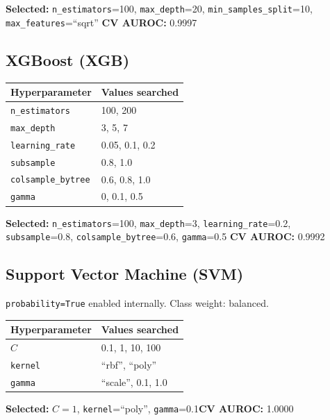 \documentclass[11pt]{article}
\begin{document}
\noindent\textbf{Selected:} \texttt{n\_estimators}=100, \texttt{max\_depth}=20,
\texttt{min\_samples\_split}=10, \texttt{max\_features}=``sqrt''\quad
\textbf{CV AUROC:} 0.9997

\subsection*{XGBoost (XGB)}

\begin{center}
\begin{tabular}{ll}
\toprule
Hyperparameter & Values searched \\
\midrule
\texttt{n\_estimators}      & 100, 200 \\
\texttt{max\_depth}         & 3, 5, 7 \\
\texttt{learning\_rate}     & 0.05, 0.1, 0.2 \\
\texttt{subsample}          & 0.8, 1.0 \\
\texttt{colsample\_bytree}  & 0.6, 0.8, 1.0 \\
\texttt{gamma}              & 0, 0.1, 0.5 \\
\bottomrule
\end{tabular}
\end{center}

\noindent\textbf{Selected:} \texttt{n\_estimators}=100, \texttt{max\_depth}=3,
\texttt{learning\_rate}=0.2, \texttt{subsample}=0.8,
\texttt{colsample\_bytree}=0.6, \texttt{gamma}=0.5\quad
\textbf{CV AUROC:} 0.9992

\subsection*{Support Vector Machine (SVM)}

\texttt{probability=True} enabled internally. Class weight: balanced.

\begin{center}
\begin{tabular}{ll}
\toprule
Hyperparameter & Values searched \\
\midrule
$C$            & 0.1, 1, 10, 100 \\
\texttt{kernel}& ``rbf'', ``poly'' \\
\texttt{gamma} & ``scale'', 0.1, 1.0 \\
\bottomrule
\end{tabular}
\end{center}

\noindent\textbf{Selected:} $C=1$, \texttt{kernel}=``poly'',
\texttt{gamma}=0.1\quad\textbf{CV AUROC:} 1.0000
\end{document}
